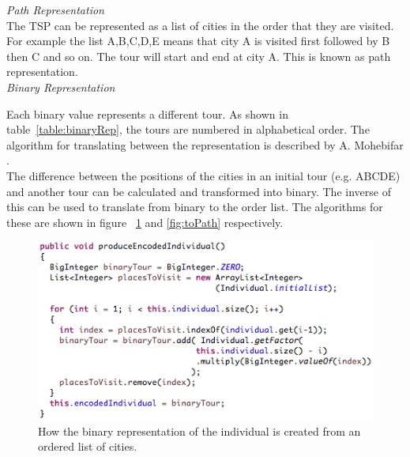 \documentclass[10pt,a4paper,openbib]{article}
\begin{document}
\begin{multicols}{2}

\noindent \textit{Path Representation} \\

\noindent The TSP can be represented as a list of cities in the order that they are visited. For example the list A,B,C,D,E means that city A is visited first followed by B then C and so on. The tour will start and end at city A.  This is known as path representation.\cite{abdoun2012analyzing} \\

\noindent \textit{Binary Representation}

\noindent Each binary value represents a different tour. As shown in table~\ref{table:binaryRep}, the tours are numbered in alphabetical order. The algorithm for translating between the representation is described by A. Mohebifar \cite{mohebifar2006new}. \\

\noindent The difference between the positions of the cities in an initial tour (e.g. ABCDE) and another tour can be calculated and transformed into binary. The inverse of this can be used to translate from binary to the order list. The algorithms for these are shown in figure ~\ref{fig:makeBinary} and \ref{fig:toPath} respectively.\\

\begin{figure}[H]
\begin{center}
\includegraphics[scale=0.5]{images/makeBinary.png} 
\caption{How the binary representation of the individual is created from an ordered list of cities. }
\label{fig:makeBinary}
\end{center}
\end{figure}


\end{multicols}
\end{document}
